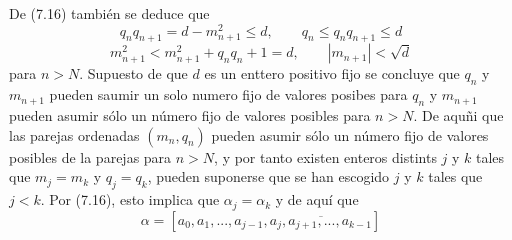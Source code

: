 \documentclass[11pt, article]{article}
\begin{document}
    De (7.16) también se deduce que 
        \[
        q_nq_{n+1}=d-m^2_{n+1}\leq d, \qquad q_n\leq q_nq_{n+1}\leq d 
        \]
        \[
        m^2_{n+1} < m_{n+1}^2+q_n q_n+1=d, \qquad |m_{n+1}|<\sqrt{d}
        \]
    para $n>N$. Supuesto de que $d$ es un enttero positivo fijo se concluye que $q_n$ y $m_{n+1}$ pueden saumir un solo numero fijo de valores posibes para $q_n$ y $m_{n+1}$ pueden asumir sólo un número fijo de valores posibles para $n>N$. De aquñi que las parejas ordenadas $(m_n,q_n)$ pueden asumir sólo un número fijo de valores posibles de la parejas para $n>N$, y por tanto existen enteros distints $j$ y $k$ tales que $m_j=m_k$ y $q_j=q_k$, pueden suponerse que se han escogido $j$ y $k$ tales que $j<k$. Por (7.16), esto implica que $\alpha_j=\alpha_k$ y de aquí que
        \[
        \alpha=[a_0,a_1,...,a_{j-1},\overline{a_j,a_{j+1},...,a_{k-1}}]
        \]
\end{document}
